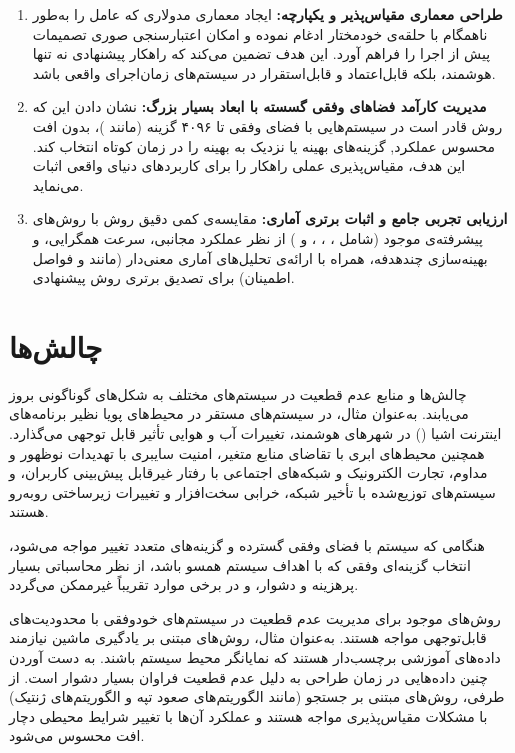 \documentclass[oneside,openany,phd]{TMU-Thesis}
\begin{document}
\begin{enumerate}
    \item \textbf{طراحی معماری مقیاس‌پذیر و یکپارچه:} ایجاد معماری مدولاری که عامل  را به‌طور ناهمگام با حلقه‌ی خودمختار  ادغام نموده و امکان اعتبارسنجی صوری تصمیمات پیش از اجرا را فراهم آورد. این هدف تضمین می‌کند که راهکار پیشنهادی نه تنها هوشمند، بلکه قابل‌اعتماد و قابل‌استقرار در سیستم‌های زمان‌اجرای واقعی باشد.
    
    \item \textbf{مدیریت کارآمد فضاهای وفقی گسسته با ابعاد بسیار بزرگ:} نشان دادن این که روش  قادر است در سیستم‌هایی با فضای وفقی تا ۴۰۹۶ گزینه (مانند )، بدون افت محسوس عملکرد, گزینه‌های بهینه یا نزدیک به بهینه را در زمان کوتاه انتخاب کند. این هدف، مقیاس‌پذیری عملی راهکار را برای کاربردهای دنیای واقعی اثبات می‌نماید.
    
    \item \textbf{ارزیابی تجربی جامع و اثبات برتری آماری:} مقایسه‌ی کمی دقیق روش  با روش‌های پیشرفته‌ی موجود (شامل ، ، ،  و ) از نظر عملکرد مجانبی، سرعت همگرایی، و بهینه‌سازی چندهدفه، همراه با ارائه‌ی تحلیل‌های آماری معنی‌دار (مانند  و فواصل اطمینان) برای تصدیق برتری روش پیشنهادی.
\end{enumerate}

\section{چالش‌ها}

چالش‌ها و منابع عدم قطعیت در سیستم‌های مختلف به شکل‌های گوناگونی بروز می‌یابند. به‌عنوان مثال، در سیستم‌های مستقر در محیط‌های پویا نظیر برنامه‌های اینترنت اشیا () در شهرهای هوشمند، تغییرات آب و هوایی تأثیر قابل توجهی می‌گذارد. همچنین محیط‌های ابری با تقاضای منابع متغیر، امنیت سایبری با تهدیدات نوظهور و مداوم، تجارت الکترونیک و شبکه‌های اجتماعی با رفتار غیرقابل پیش‌بینی کاربران، و سیستم‌های توزیع‌شده با تأخیر شبکه، خرابی سخت‌افزار و تغییرات زیرساختی روبه‌رو هستند.

هنگامی که سیستم با فضای وفقی گسترده و گزینه‌های متعدد تغییر مواجه می‌شود، انتخاب گزینه‌ای وفقی که با اهداف سیستم همسو باشد، از نظر محاسباتی بسیار پرهزینه و دشوار، و در برخی موارد تقریباً غیرممکن می‌گردد.

روش‌های موجود برای مدیریت عدم قطعیت در سیستم‌های خودوفقی با محدودیت‌های قابل‌توجهی مواجه هستند. به‌عنوان مثال، روش‌های مبتنی بر یادگیری ماشین نیازمند داده‌های آموزشی برچسب‌دار هستند که نمایانگر محیط سیستم باشند. به دست آوردن چنین داده‌هایی در زمان طراحی به دلیل عدم قطعیت فراوان بسیار دشوار است. از طرفی، روش‌های مبتنی بر جستجو (مانند الگوریتم‌های صعود تپه و الگوریتم‌های ژنتیک) با مشکلات مقیاس‌پذیری مواجه هستند و عملکرد آن‌ها با تغییر شرایط محیطی دچار افت محسوس می‌شود.
\end{document}
